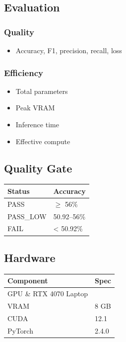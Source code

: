 \subsection{Evaluation}

\subsubsection{Quality}
\begin{itemize}
\item Accuracy, F1, precision, recall, loss

\end{itemize}
\subsubsection{Efficiency}
\begin{itemize}
\item Total parameters
\item Peak VRAM
\item Inference time
\item Effective compute

\end{itemize}
\subsection{Quality Gate}

\begin{table}[H]
\centering
\small
\begin{tabular}{ll}
\toprule
\textbf{Status} & \textbf{Accuracy} \\
\midrule
PASS & $\ge$ 56\% \\
PASS\_LOW & 50.92--56\% \\
FAIL & \textless{} 50.92\% \\
\bottomrule
\end{tabular}
\end{table}

\subsection{Hardware}

\begin{table}[H]
\centering
\small
\begin{tabular}{ll}
\toprule
\textbf{Component} & \textbf{Spec} \\
\midrule
GPU \& RTX 4070 Laptop \\
VRAM & 8 GB \\
CUDA & 12.1 \\
PyTorch & 2.4.0 \\
\bottomrule
\end{tabular}
\end{table}

